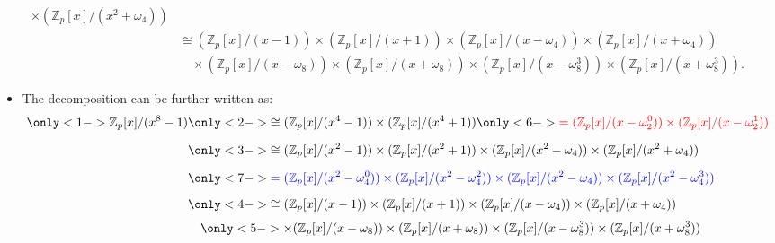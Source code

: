 \begin{frame}
\begin{itemize}
\begin{align*}
        \times
        (\mathbb{Z}_{p}[x]/(x^{2}+\omega_{4})) \\[6pt]
&\cong (\mathbb{Z}_{p}[x]/(x-1))
        \times
        (\mathbb{Z}_{p}[x]/(x+1))
        \times
        (\mathbb{Z}_{p}[x]/(x-\omega_{4}))
        \times
        (\mathbb{Z}_{p}[x]/(x+\omega_{4})) \\[3pt]
&\quad\times (\mathbb{Z}_{p}[x]/(x-\omega_{8}))
        \times
        (\mathbb{Z}_{p}[x]/(x+\omega_{8}))
        \times
        (\mathbb{Z}_{p}[x]/(x-\omega_{8}^{3}))
        \times
        (\mathbb{Z}_{p}[x]/(x+\omega_{8}^{3})).
\end{align*}
    \end{itemize}
\end{frame}

\begin{frame}
    \begin{itemize}
        \item The decomposition can be further written as:
\               \begin{align*}
    \only<1->{\mathbb{Z}_{p}[x]/(x^{8}-1)}
    &\only<2->{\cong(\mathbb{Z}_{p}[x]/(x^{4}-1))
            \times
            (\mathbb{Z}_{p}[x]/(x^{4}+1)) }
     \only<6->{{\color{red}= (\mathbb{Z}_{p}[x]/(x-\omega_{2}^{0}))
            \times
            (\mathbb{Z}_{p}[x]/(x-\omega_{2}^{1}))}} \\[6pt]
    &\only<3->{\cong(\mathbb{Z}_{p}[x]/(x^{2}-1))
            \times
            (\mathbb{Z}_{p}[x]/(x^{2}+1))
            \times
            (\mathbb{Z}_{p}[x]/(x^{2}-\omega_{4}))
            \times
            (\mathbb{Z}_{p}[x]/(x^{2}+\omega_{4}))} \\[6pt]
    &\only<7->{\color{blue}= (\mathbb{Z}_{p}[x]/(x^{2}-\omega_{4}^{0}))
            \times
            (\mathbb{Z}_{p}[x]/(x^{2}-\omega_{4}^{2}))
            \times
            (\mathbb{Z}_{p}[x]/(x^{2}-\omega_{4}))
            \times
            (\mathbb{Z}_{p}[x]/(x^{2}-\omega_{4}^{3}))} \\[6pt]
    &\only<4->{\cong(\mathbb{Z}_{p}[x]/(x-1))
            \times
            (\mathbb{Z}_{p}[x]/(x+1))
            \times
            (\mathbb{Z}_{p}[x]/(x-\omega_{4}))
            \times
            (\mathbb{Z}_{p}[x]/(x+\omega_{4}))} \\[3pt]
    &\quad\only<5->{\times (\mathbb{Z}_{p}[x]/(x-\omega_{8}))
            \times
            (\mathbb{Z}_{p}[x]/(x+\omega_{8}))
            \times
            (\mathbb{Z}_{p}[x]/(x-\omega_{8}^{3}))
            \times
            (\mathbb{Z}_{p}[x]/(x+\omega_{8}^{3}))} \\[6pt]

\end{align*}
\end{itemize}
\end{frame}
